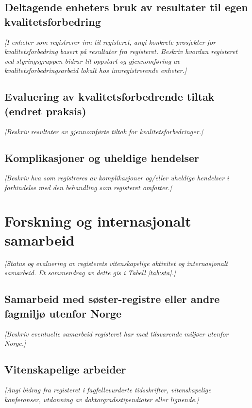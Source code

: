 \documentclass[norsk, a4paper, twocolumn]{report}
\newcommand{\guide}[1] {
	\textit{[\textcolor{guidegray}{#1}]}
	}
\begin{document}

\section{Deltagende enheters bruk av resultater til egen kvalitetsforbedring}\label{sec:brures}
\guide{I enheter som registrerer inn til registeret, angi konkrete prosjekter
for kvalitetsforbedring basert på resultater fra registeret. Beskriv
hvordan registeret ved styringsgruppen bidrar til oppstart og gjennomføring
av kvalitetsforbedringsarbeid lokalt hos innregistrerende enheter.}

\section{Evaluering av kvalitetsforbedrende tiltak (endret praksis)}\label{sec:evakva}
\guide{Beskriv resultater av gjennomførte tiltak for kvalitetsforbedringer.}

\section{Komplikasjoner og uheldige hendelser}\label{sec:kom}
\guide{Beskriv hva som registreres av komplikasjoner og/eller uheldige
hendelser i forbindelse med den behandling som registeret omfatter.}

\chapter{Forskning og internasjonalt samarbeid}\label{cha:for}
\guide{Status og evaluering av registerets vitenskapelige aktivitet og
internasjonalt samarbeid. Et sammendrag av dette gis i Tabell 
\ref{tab:sta}.}

\section{Samarbeid med søster-registre eller andre fagmiljø utenfor Norge}\label{sec:samfag}
\guide{Beskriv eventuelle samarbeid registeret har med tilsvarende miljøer
utenfor Norge.}

\section{Vitenskapelige arbeider}\label{sec:vitarb}
\guide{Angi bidrag fra registeret i fagfellevurderte tidsskrifter,
vitenskapelige konferanser, utdanning av doktorgradsstipendiater eller
lignende.}
\end{document}

